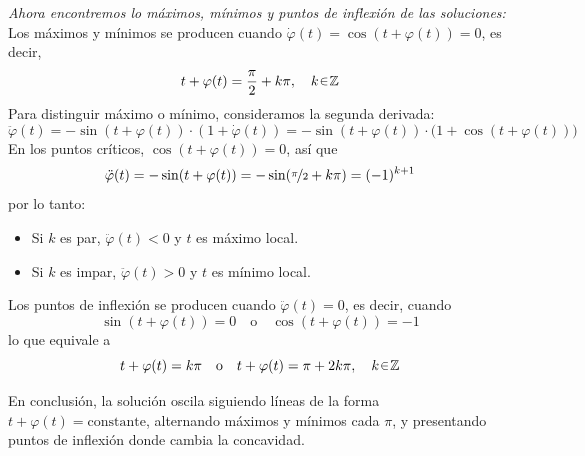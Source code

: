\begin{sol}[Demostración]
\vspace{1em}
\emph{Ahora encontremos lo máximos, mínimos y puntos de inflexión de las soluciones:}\\
Los máximos y mínimos se producen cuando $\dot{\varphi}(t) = \cos(t+\varphi(t)) = 0$, es decir,
\[
    t + \varphi(t) = \frac{\pi}{2} + k\pi, \quad k \en \mathbb{Z}
\]
Para distinguir máximo o mínimo, consideramos la segunda derivada:
\[
    \ddot{\varphi}(t) = -\sin(t+\varphi(t)) \cdot (1 + \dot{\varphi}(t)) = -\sin(t+\varphi(t)) \cdot \big(1 + \cos(t+\varphi(t))\big)
\]
En los puntos críticos, $\cos(t+\varphi(t))=0$, así que
\[
    \ddot{\varphi}(t) = -\sin(t+\varphi(t)) = -\sin(\nicefrac{\pi}{2} + k\pi) = (-1)^{k+1}
\]
por lo tanto:
\begin{itemize}
    \item Si $k$ es par, $\ddot{\varphi}(t)<0$ y $t$ es máximo local.
    \item Si $k$ es impar, $\ddot{\varphi}(t)>0$ y $t$ es mínimo local.
\end{itemize}
Los puntos de inflexión se producen cuando $\ddot{\varphi}(t)=0$, es decir, cuando
\[
    \sin(t+\varphi(t)) = 0 \quad \text{o} \quad \cos(t+\varphi(t))=-1
\]
lo que equivale a
\[
    t + \varphi(t) = k\pi \quad \text{o} \quad t + \varphi(t) = \pi + 2k\pi, \quad k \en \mathbb{Z}
\]

En conclusión, la solución oscila siguiendo líneas de la forma $t + \varphi(t) = \text{constante}$, alternando máximos y mínimos cada $\pi$, y presentando puntos de inflexión donde cambia la concavidad.
\end{sol}



